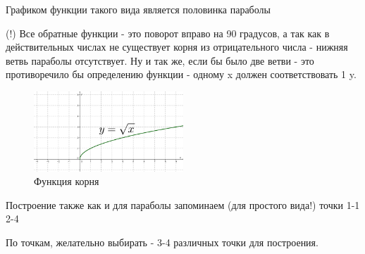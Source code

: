 Графиком функции такого вида является половинка параболы

(!) Все обратные функции - это поворот вправо на 90 градусов, а так как в действительных числах не существует корня из отрицательного числа - нижняя ветвь параболы отсутствует. Ну и так же, если бы было две ветви - это противоречило бы определению функции - одному x должен соответствовать 1 y.

\begin{figure}[h!]
	\centering
	\includegraphics[width=0.5\textwidth]{img/sqrt.png}
	\caption{Функция корня}
\end{figure}

Построение также как и для параболы запоминаем (для простого вида!) точки 1-1 2-4

По точкам, желательно выбирать - 3-4 различных точки для построения.

